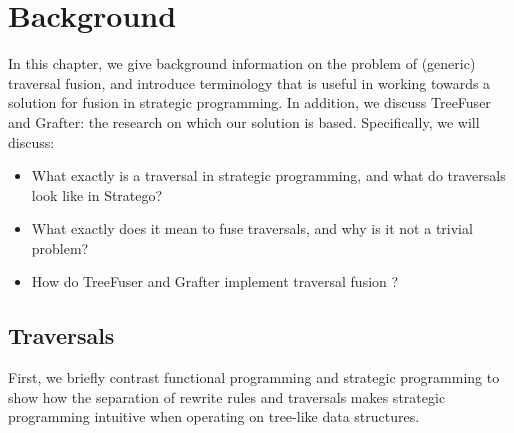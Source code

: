 

\chapter{\label{chap:background}Background}
In this chapter, we give background information on the problem of (generic) traversal fusion, and introduce terminology that is useful in working towards a solution for fusion in strategic programming. In addition, we discuss TreeFuser and Grafter: the research on which our solution is based\autocite{SakkaS017, SakkaSN019}. Specifically, we will discuss:

\begin{itemize}
    \item What exactly is a traversal in strategic programming, and what do traversals look like in Stratego?
    \item What exactly does it mean to fuse traversals, and why is it not a trivial problem?
    \item How do TreeFuser and Grafter implement traversal fusion \autocite{SakkaS017, SakkaSN019}?
\end{itemize}

\section{Traversals}
First, we briefly contrast functional programming and strategic programming to show how the separation of rewrite rules and traversals makes strategic programming intuitive when operating on tree-like data structures.

